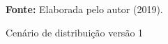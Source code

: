 \begin{figure}[ht!]
\centering

\caption{\textmd{Cenário de distribuição versão 1}}
\label{fig:cenario1}

\par\medskip\textbf{Fonte:} Elaborada pelo autor (2019). \par\medskip
\end{figure}

